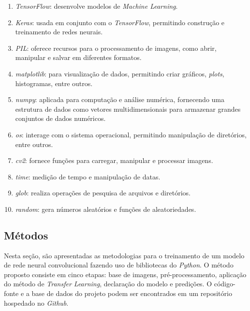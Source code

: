 \begin{enumerate}[label=\alph*)]
    \item \textit{TensorFlow}: desenvolve modelos de \textit{Machine Learning}.
    
    \item \textit{Keras}: usada em conjunto com o \textit{TensorFlow}, permitindo construção e treinamento de redes neurais.
    
    \item \textit{PIL}: oferece recursos para o processamento de imagens, como abrir, manipular e salvar em diferentes formatos.
        
    \item \textit{matplotlib}: para visualização de dados, permitindo criar gráficos, \textit{plots}, histogramas, entre outros.
    
    \item \textit{numpy}: aplicada para computação e análise numérica, fornecendo uma estrutura de dados como vetores multidimensionais para armazenar grandes conjuntos de dados numéricos.

    \item \textit{os}: interage com o sistema operacional, permitindo manipulação de diretórios, entre outros.

    \item \textit{cv2}: fornece funções para carregar, manipular e processar imagens.

    \item \textit{time}: medição de tempo e manipulação de datas.

    \item \textit{glob}: realiza operações de pesquisa de arquivos e diretórios.

    \item \textit{random}: gera números aleatórios e funções de aleatoriedades.
\end{enumerate}




\subsection{\esp Métodos} \label{metodos}

Nesta seção, são apresentadas as metodologias para o treinamento de um modelo de rede neural convolucional fazendo uso de bibliotecas do \textit{Python}. O método proposto consiste em cinco etapas: base de imagens, pré-processamento, aplicação do método de \textit{Transfer Learning}, declaração do modelo e predições. O código-fonte e a base de dados do projeto podem ser encontrados em um repositório hospedado no \textit{Github}.

